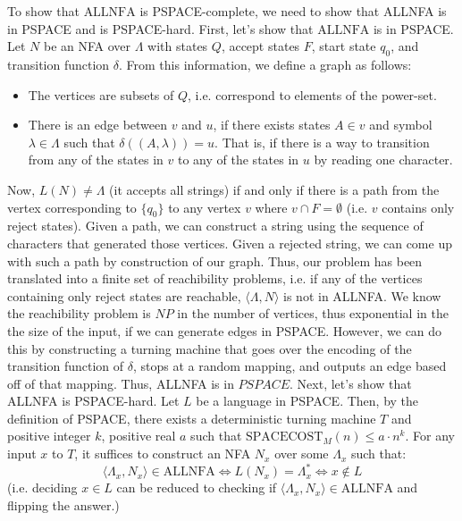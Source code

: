 \documentclass[12pt]{article}
\begin{document}
\begin{solution}
    To show that $\text{ALLNFA}$ is PSPACE-complete, we need to show that ALLNFA is in PSPACE and is PSPACE-hard. \bbni
    First, let's show that $\text{ALLNFA}$ is in PSPACE. Let $N$ be an NFA over $\Lambda$ with states $Q$, accept states $F$, start state $q_0$, and transition function $\delta$. From this information, we define a graph as follows: 
    \begin{itemize}
        \item The vertices are subsets of $Q$, i.e. correspond to elements of the power-set. 
        \item There is an edge between $v$ and $u$, if there exists states $A \in v$ and symbol $\lambda \in \Lambda$ such that $\delta((A, \lambda)) = u$. That is, if there is a way to transition from any of the states in $v$ to any of the states in $u$ by reading one character.
    \end{itemize}
    Now, $L(N) \neq \Lambda$ (it accepts all strings) if and only if there is a path from the vertex corresponding to $\{q_0\}$ to any vertex $v$ where $v \cap F = \emptyset$ (i.e. $v$ contains only reject states). Given a path, we can construct a string using the sequence of characters that generated those vertices. Given a rejected string, we can come up with such a path by construction of our graph. \bbni
    Thus, our problem has been translated into a finite set of reachibility problems, i.e. if any of the vertices containing only reject states are reachable, $\langle \Lambda, N\rangle$ is not in ALLNFA. \bbni 
    We know the reachibility problem is $NP$ in the number of vertices, thus exponential in the the size of the input, if we can generate edges in PSPACE. However, we can do this by constructing a turning machine that goes over the encoding of the transition function of $\delta$, stops at a random mapping, and outputs an edge based off of that mapping. Thus, ALLNFA is in $PSPACE$.  
    \bbni
    Next, let's show that ALLNFA is PSPACE-hard. Let $L$ be a language in PSPACE. Then, by the definition of PSPACE, there exists a deterministic turning machine $T$ and positive integer $k$, positive real $a$ such that $\text{SPACECOST}_M(n) \leq a \cdot n^k$. For any input $x$ to $T$, it suffices to construct an NFA $N_x$ over some $\Lambda_x$ such that: 
    \[ \langle \Lambda_x, N_x \rangle \in \text{ALLNFA} \iff L(N_x) = \Lambda_x^*  \iff x \not \in L \]
    (i.e. deciding $x \in L$ can be reduced to checking if $\langle \Lambda_x, N_x\rangle \in \text{ALLNFA}$ and flipping the answer.) \bbni

\end{solution}
\end{document}
